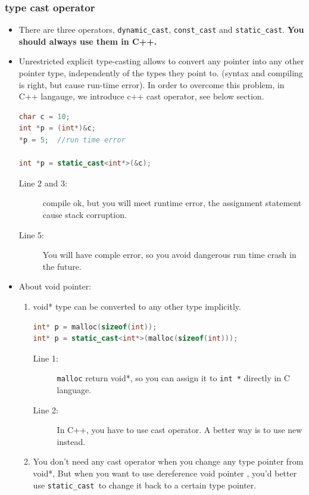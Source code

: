\documentclass[a4paper,11pt,twoside]{book}
\begin{document}
\subsubsection{type cast operator}
\begin{itemize}
	\item There are three operators, \texttt{dynamic\_cast}, \texttt{const\_cast} and \texttt{static\_cast}. \textbf{You should always use them in C++.}
	
	\item Unrestricted explicit type-casting allows to convert any pointer into any other pointer type, independently of the types they point to.  (syntax and compiling is right, but cause run-time error). In order to overcome this problem,  in C++ langauge, we introduce c++ cast operator, see below section.
\begin{lstlisting}[frame=single, language=c++]
char c = 10;    
int *p = (int*)&c; 
*p = 5;  //run time error 
	
int *p = static_cast<int*>(&c); 
\end{lstlisting}
\begin{description}
	\item[Line 2 and 3:] compile ok, but you will meet runtime error, the assignment statement cause stack corruption.
	\item[Line 5:] You will have comple error, so you avoid dangerous run time crash in the future.
\end{description}
	
	\item About void pointer:
	\begin{enumerate}
		\item void* type can be converted to any other type implicitly.
\begin{lstlisting}[frame=single, language=c++]
int* p = malloc(sizeof(int));
int* p = static_cast<int*>(malloc(sizeof(int)));
\end{lstlisting}
\begin{description}
	\item[Line 1:] \texttt{malloc} return void*, so you can assign it to \texttt{int *} directly in C language.
	\item[Line 2:] In C++, you have to use cast operator. A better way is to use new instead.
\end{description}

	\item You don't need any cast operator when you change any type pointer from void*, But when you want to use dereference void pointer , you'd better use \texttt{static\_cast }to change it back to a certain type pointer.
	\end{enumerate}
	

\end{itemize}
\end{document}
